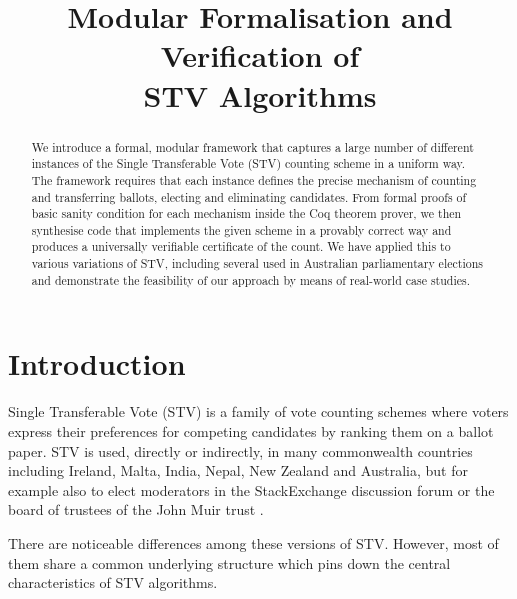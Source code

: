 \documentclass{llncs}
\title{Modular Formalisation and Verification of \\STV Algorithms}
\author{} %
\begin{document}
\maketitle
\pagestyle{plain}
\thispagestyle{empty}
\begin{abstract}
We introduce a formal, modular framework that captures a large number of
different instances of the Single Transferable Vote (STV) counting
scheme in a uniform way. The framework requires that each instance
defines the precise mechanism of counting and transferring ballots,
electing and eliminating candidates. From formal proofs of basic
sanity condition for each mechanism inside the Coq theorem prover, we then synthesise
code that implements the given scheme in a provably correct way and
produces a universally verifiable certificate of the count. We have
applied this to various variations of STV, including several  used in Australian
parliamentary elections and demonstrate the feasibility of our
approach by means of real-world case studies.
\end{abstract}

\section{Introduction}
 Single Transferable Vote (STV) is a family of 
 vote counting schemes where voters express their 
 preferences for competing candidates by ranking them on a ballot
 paper. STV is used, directly or indirectly, in many commonwealth
 countries including Ireland, Malta, India, Nepal, New Zealand and
 Australia, but for example also to elect moderators in the
 StackExchange discussion forum \cite{StackExchange:2018:ME} or the
 board of trustees of the John Muir trust \cite{Trust:2018:AT}. 

 There are noticeable
 differences among these versions of STV. However, most of them
 share a common underlying structure which pins down the central
 characteristics of STV algorithms.
 
\end{document}
